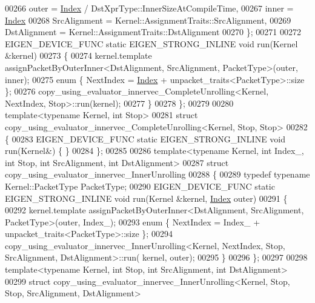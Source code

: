 \begin{DoxyCode}
00266     outer = \hyperlink{namespace_eigen_a62e77e0933482dafde8fe197d9a2cfde}{Index} / DstXprType::InnerSizeAtCompileTime,
00267     inner = \hyperlink{namespace_eigen_a62e77e0933482dafde8fe197d9a2cfde}{Index} %
00268     SrcAlignment = Kernel::AssignmentTraits::SrcAlignment,
00269     DstAlignment = Kernel::AssignmentTraits::DstAlignment
00270   \};
00271 
00272   EIGEN\_DEVICE\_FUNC \textcolor{keyword}{static} EIGEN\_STRONG\_INLINE \textcolor{keywordtype}{void} run(Kernel &kernel)
00273   \{
00274     kernel.template assignPacketByOuterInner<DstAlignment, SrcAlignment, PacketType>(outer, inner);
00275     \textcolor{keyword}{enum} \{ NextIndex = \hyperlink{namespace_eigen_a62e77e0933482dafde8fe197d9a2cfde}{Index} + unpacket\_traits<PacketType>::size \};
00276     copy\_using\_evaluator\_innervec\_CompleteUnrolling<Kernel, NextIndex, Stop>::run(kernel);
00277   \}
00278 \};
00279 
00280 \textcolor{keyword}{template}<\textcolor{keyword}{typename} Kernel, \textcolor{keywordtype}{int} Stop>
00281 \textcolor{keyword}{struct }copy\_using\_evaluator\_innervec\_CompleteUnrolling<Kernel, Stop, Stop>
00282 \{
00283   EIGEN\_DEVICE\_FUNC \textcolor{keyword}{static} EIGEN\_STRONG\_INLINE \textcolor{keywordtype}{void} run(Kernel&) \{ \}
00284 \};
00285 
00286 \textcolor{keyword}{template}<\textcolor{keyword}{typename} Kernel, \textcolor{keywordtype}{int} Index\_, \textcolor{keywordtype}{int} Stop, \textcolor{keywordtype}{int} SrcAlignment, \textcolor{keywordtype}{int} DstAlignment>
00287 \textcolor{keyword}{struct }copy\_using\_evaluator\_innervec\_InnerUnrolling
00288 \{
00289   \textcolor{keyword}{typedef} \textcolor{keyword}{typename} Kernel::PacketType PacketType;
00290   EIGEN\_DEVICE\_FUNC \textcolor{keyword}{static} EIGEN\_STRONG\_INLINE \textcolor{keywordtype}{void} run(Kernel &kernel, \hyperlink{namespace_eigen_a62e77e0933482dafde8fe197d9a2cfde}{Index} outer)
00291   \{
00292     kernel.template assignPacketByOuterInner<DstAlignment, SrcAlignment, PacketType>(outer, Index\_);
00293     \textcolor{keyword}{enum} \{ NextIndex = Index\_ + unpacket\_traits<PacketType>::size \};
00294     copy\_using\_evaluator\_innervec\_InnerUnrolling<Kernel, NextIndex, Stop, SrcAlignment, DstAlignment>::run(
      kernel, outer);
00295   \}
00296 \};
00297 
00298 \textcolor{keyword}{template}<\textcolor{keyword}{typename} Kernel, \textcolor{keywordtype}{int} Stop, \textcolor{keywordtype}{int} SrcAlignment, \textcolor{keywordtype}{int} DstAlignment>
00299 \textcolor{keyword}{struct }copy\_using\_evaluator\_innervec\_InnerUnrolling<Kernel, Stop, Stop, SrcAlignment, DstAlignment>

\end{DoxyCode}
